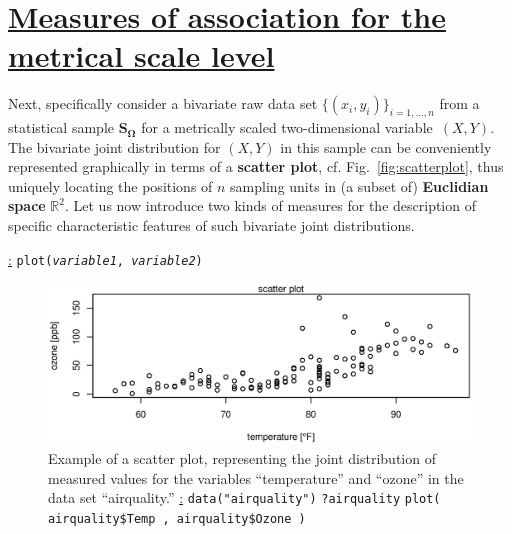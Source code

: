 \section[Measures of association for the metrical scale
level]{\href{https://www.youtube.com/watch?v=8o-Z2i_aOOU}{Measures
of association for the metrical scale level}}
Next, specifically consider a bivariate raw data set 
$\{(x_{i},y_{i})\}_{i=1,\ldots,n}$ from a statistical sample 
$\boldsymbol{S_{\Omega}}$ for a metrically scaled two-dimensional
variable~$(X,Y)$. The bivariate joint distribution for $(X,Y)$ in 
this sample can be conveniently represented graphically in terms 
of a \textbf{scatter plot}, cf. Fig.~\ref{fig:scatterplot}, thus
uniquely locating the positions of 
$n$ sampling units in (a subset of) \textbf{Euclidian space} 
$\mathbb{R}^{2}$. Let us now introduce two kinds of 
measures for the description of specific characteristic features 
of such bivariate joint distributions.

\medskip
\noindent
\underline{\R:} \texttt{plot(\textit{variable1},
\textit{variable2})}

%
\begin{figure}[!htb]
\begin{center}
\includegraphics[scale=0.8]{scatterplot.eps}
\end{center}
\caption{Example of a scatter plot, representing the joint
distribution of measured values for the variables ``temperature''
and ``ozone'' in the \R{} data set ``airquality.'' \newline
\underline{\R:} \newline
\texttt{data("airquality")} \newline
\texttt{?airquality} \newline
\texttt{plot( airquality\$Temp , airquality\$Ozone )}}
\end{figure}
%

